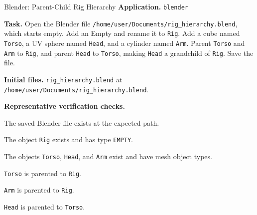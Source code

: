 \documentclass{llmxive}
\providecommand{\taskfield}[1]{\vspace{0.25em}\noindent\textbf{#1.}}
\begin{document}
\begin{taskexample}{Blender: Parent-Child Rig Hierarchy}
\taskfield{Application} \texttt{blender}

\taskfield{Task} Open the Blender file
\texttt{/home/user/Documents/rig\_hierarchy.blend}, which starts empty. Add an
Empty and rename it to \texttt{Rig}. Add a cube named \texttt{Torso}, a UV
sphere named \texttt{Head}, and a cylinder named \texttt{Arm}. Parent
\texttt{Torso} and \texttt{Arm} to \texttt{Rig}, and parent \texttt{Head} to
\texttt{Torso}, making \texttt{Head} a grandchild of \texttt{Rig}. Save the
file.

\taskfield{Initial files}
\texttt{rig\_hierarchy.blend} at
\texttt{/home/user/Documents/rig\_hierarchy.blend}.

\taskfield{Representative verification checks}
\begin{compactitem}
    \item The saved Blender file exists at the expected path.
    \item The object \texttt{Rig} exists and has type \texttt{EMPTY}.
    \item The objects \texttt{Torso}, \texttt{Head}, and \texttt{Arm} exist and
    have mesh object types.
    \item \texttt{Torso} is parented to \texttt{Rig}.
    \item \texttt{Arm} is parented to \texttt{Rig}.
    \item \texttt{Head} is parented to \texttt{Torso}.
\end{compactitem}
\end{taskexample}
\end{document}
